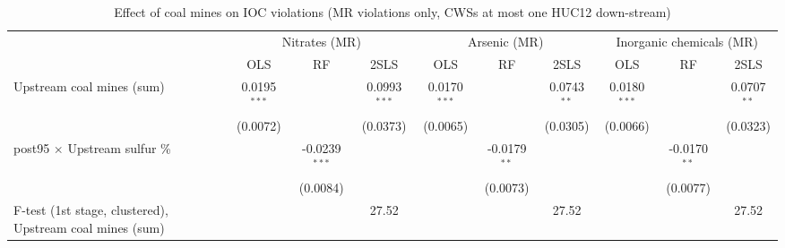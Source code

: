 
\begin{table}[htbp]
   
   \caption{\label{2sls_dwnstrm_minevio_mr_ivsum_binvio} Effect of coal mines on IOC violations (MR violations only, CWSs at most one HUC12 down-stream)}
   \bigskip
   
   \centering
   
   \begin{adjustbox}{width = \textwidth, center}
      
      
      \begin{tabular}{lccccccccc}
         \toprule
         
          & \multicolumn{3}{c}{Nitrates (MR)} & \multicolumn{3}{c}{Arsenic (MR)} & \multicolumn{3}{c}{Inorganic chemicals (MR)}\\
         
                                                                  & OLS            & RF              & 2SLS           & OLS            & RF             & 2SLS          & OLS            & RF             & 2SLS\\  
         
         \midrule 
         Upstream coal mines (sum)                                & 0.0195$^{***}$ &                 & 0.0993$^{***}$ & 0.0170$^{***}$ &                & 0.0743$^{**}$ & 0.0180$^{***}$ &                & 0.0707$^{**}$\\   
                                                                  & (0.0072)       &                 & (0.0373)       & (0.0065)       &                & (0.0305)      & (0.0066)       &                & (0.0323)\\   
         post95 $\times$ Upstream sulfur \%                       &                & -0.0239$^{***}$ &                &                & -0.0179$^{**}$ &               &                & -0.0170$^{**}$ &   \\   
                                                                  &                & (0.0084)        &                &                & (0.0073)       &               &                & (0.0077)       &   \\   
         
         F-test (1st stage, clustered), Upstream coal mines (sum) &                &                 & 27.52          &                &                & 27.52         &                &                & 27.52\\  
         

\end{tabular}
\end{adjustbox}
\end{table}
